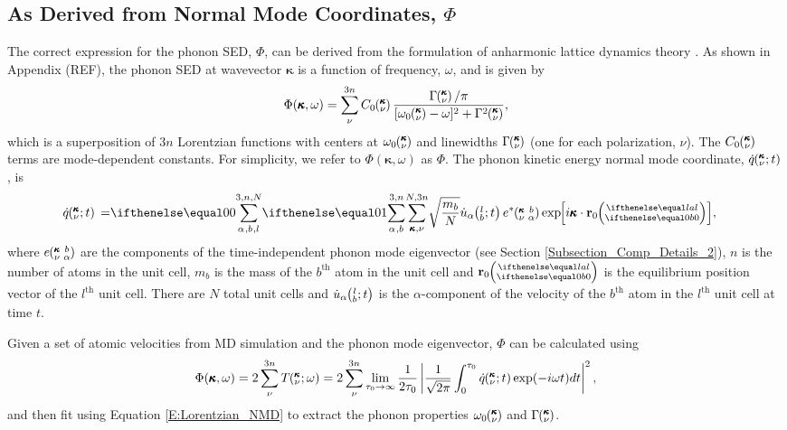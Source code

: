 \subsection{\label{S:Subsection_NMD}As Derived from Normal Mode 
Coordinates, $\Phi$}
The correct expression for the phonon SED, $\Phi$, can be derived from 
the formulation of anharmonic 
lattice dynamics theory 
\cite{maradudin_dynamical_1974,wallace_thermodynamics_1972,
dove_introduction_1993,srivastava_physics_1990}. 
As shown in Appendix (REF), the phonon SED at wavevector $\pmb{\kappa}$ 
is a function of frequency, $\omega$, 
and is given by
\begin{equation}\label{E:Lorentzian_NMD}
\begin{split}
\Phi(\pmb{\kappa},\omega) = \sum_{\nu}^{3n}C_0\kv\frac{\Gamma\kv/\pi}
{[\omega_0\kv-\omega]^2+\Gamma^2\kv},
\end{split}
\end{equation}
which is a superposition of $3n$ Lorentzian functions with centers at 
$\omega_0\kv$ and linewidths 
$\Gamma \kv$ (one for each polarization, $\nu$). The $C_0 \kv$ terms 
are mode-dependent constants. 
For simplicity, we refer to $\Phi(\pmb{\kappa},\omega)$ as $\Phi$. 
The
phonon kinetic energy normal mode coordinate, $\dot{q}\kvt$, is 
\cite{dove_introduction_1993}
\begin{equation}\label{A:E:qdot_HLD}
\begin{split}
\dot{q}\kvt{}{}{}=&\SUM{0}{}\sqrt{\frac{m_b}{N}}\dot{u}_{\alpha}\lbt 
e^*\kvba\EXP{i\pmb{\kappa}\cdot\mathbf{r}_0\ab{l}{0}},
\end{split}
\end{equation}
where $e\kvba$ are the components of the time-independent phonon mode 
eigenvector (see Section \ref{Subsection_Comp_Details_2}), 
$n$ is the number of atoms in the unit cell, 
$m_b$ is the mass of the $b^{\textrm{th}}$ atom in the unit cell and
$\mathbf{r}_0\ab{l}{0}$ is the equilibrium position vector of the
$l^{\textrm{th}}$ unit cell. There are $N$ total unit cells and 
$\dot{u}_{\alpha}\lbt$ 
is the $\alpha$-component of the velocity of the
$b^{\textrm{th}}$ atom in the $l^{\textrm{th}}$ unit cell at time $t$.

Given a set of atomic velocities 
from MD simulation and the phonon mode eigenvector, $\Phi$ can be 
calculated using
\begin{equation}\label{A:E:Lorentzian_NMD}
\begin{split}
\Phi(\pmb{\kappa},\omega) = 2\sum_{\nu}^{3n} T\kvw=2\sum_{\nu}^{3n} 
\lim_{\tau_0\rightarrow\infty}\frac{1}{2\tau_0}\left|
\frac{1}{\sqrt{2\pi}}\int_{0}^{\tau_0}\dot{q}\kvt
\exp(-i\omega t)dt\right|^2,
\end{split}
\end{equation}
and then fit using 
Equation \eqref{E:Lorentzian_NMD} to extract the phonon properties 
$\omega_0\kv$ and $\Gamma\kv$.
 
